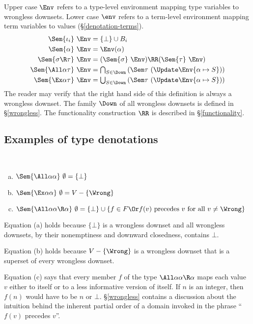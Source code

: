\documentclass{amsart}
\theoremstyle{definition}
\begin{document}
Upper case $\Env$ refers to a type-level environment mapping type
variables to wrongless downsets. Lower case $\env$ refers to a
term-level environment mapping term variables to values
(\S\ref{denotation-terms}).
\begin{align*}
\Sem{\iota_i}~\Env &= \{\bot\}\cup B_i\\
\Sem{\alpha}~\Env &= \Env(\alpha)\\
\Sem{\sigma\R\tau}~\Env&=
  (\Sem{\sigma}~\Env)\RR(\Sem{\tau}~\Env)\\
\Sem{\All\alpha\tau}~\Env&=
  {\textstyle\bigcap_{S\in\Down}}
  \left(\Sem\tau~(\Update\Env{\alpha\mapsto S})\right)\\
\Sem{\Ex\alpha\tau}~\Env&=
  {\textstyle\bigcup_{S\in\Down}}
  \left(\Sem\tau~(\Update\Env{\alpha\mapsto S})\right)
\end{align*}
The reader may verify that the right hand side of this definition
is always a wrongless downset. The family $\Down$ of all
wrongless downsets is defined in \S\ref{wrongless}. The
functionality construction $\RR$ is described in
\S\ref{functionality}.

\subsection{Examples of type denotations}
\label{free-theorems}
~
\begin{enumerate}[(a)]
\item $\Sem{\All\alpha\alpha}~\emptyset=\{\bot\}$
\item $\Sem{\Ex\alpha\alpha}~\emptyset=V-\{\Wrong\}$
\item $\Sem{\All\alpha\alpha\R\alpha}~\emptyset=\{\bot\}\cup
\{f\in F
\Or
f(v)\text{ precedes }v\text{ for all }v\neq\Wrong
\}$
\end{enumerate}

Equation (a) holds because $\{\bot\}$ is a wrongless downset and
all wrongless downsets, by their nonemptiness and downward
closedness, contains $\bot$.

Equation (b) holds because $V-\{\Wrong\}$ is a wrongless downset
that is a superset of every wrongless downset.

Equation (c) says that every member $f$ of the type
$\All\alpha\alpha\R\alpha$ maps each value~$v$ either to itself
or to a less informative version of itself. If $n$ is an integer,
then $f(n)$ would have to be $n$ or $\bot$. \S\ref{wrongless}
contains a discussion about the intuition behind the inherent
partial order of a domain invoked in the phrase ``$f(v)$ precedes
$v$''.
\end{document}
